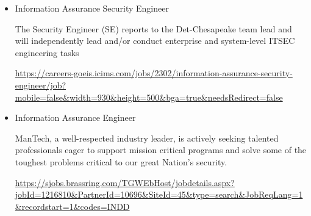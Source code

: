 \documentclass[11pt]{article}
\begin{document}
\begin{flushleft}
\begin{itemize}
\item Information Assurance Security Engineer

The Security Engineer (SE) reports to the Det-Chesapeake team lead and will independently lead and/or conduct enterprise and system-level ITSEC engineering tasks

\url{https://careers-goeis.icims.com/jobs/2302/information-assurance-security-engineer/job?mobile=false&width=930&height=500&bga=true&needsRedirect=false}


\item Information Assurance Engineer

ManTech, a well-respected industry leader, is actively seeking talented professionals eager to support mission critical programs and solve some of the toughest problems critical to our great Nation’s security.

\url{https://sjobs.brassring.com/TGWEbHost/jobdetails.aspx?jobId=1216810&PartnerId=10696&SiteId=45&type=search&JobReqLang=1&recordstart=1&codes=INDD}


\end{itemize}

\end{flushleft}

\end{document}
